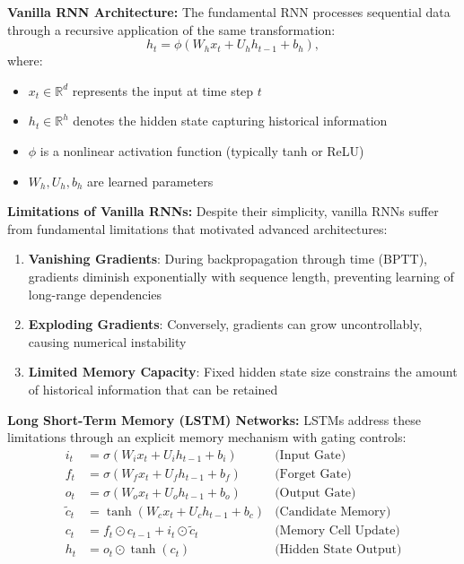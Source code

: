 \documentclass[conference]{IEEEtran}
\begin{document}
\textbf{Vanilla RNN Architecture:}
The fundamental RNN processes sequential data through a recursive application of the same transformation:
\begin{equation}
  h_t = \phi(W_h x_t + U_h h_{t-1} + b_h),
\end{equation}
where:
\begin{itemize}
  \item $x_t \in \mathbb{R}^{d}$ represents the input at time step $t$
  \item $h_t \in \mathbb{R}^{h}$ denotes the hidden state capturing historical information
  \item $\phi$ is a nonlinear activation function (typically tanh or ReLU)
  \item $W_h, U_h, b_h$ are learned parameters
\end{itemize}

\textbf{Limitations of Vanilla RNNs:}
Despite their simplicity, vanilla RNNs suffer from fundamental limitations that motivated advanced architectures:
\begin{enumerate}
  \item \textbf{Vanishing Gradients}: During backpropagation through time (BPTT), gradients diminish exponentially with sequence length, preventing learning of long-range dependencies
  \item \textbf{Exploding Gradients}: Conversely, gradients can grow uncontrollably, causing numerical instability
  \item \textbf{Limited Memory Capacity}: Fixed hidden state size constrains the amount of historical information that can be retained
\end{enumerate}

\textbf{Long Short-Term Memory (LSTM) Networks:}
LSTMs address these limitations through an explicit memory mechanism with gating controls:
\begin{align}
  i_t &= \sigma(W_i x_t + U_i h_{t-1} + b_i) & \text{(Input Gate)} \\
  f_t &= \sigma(W_f x_t + U_f h_{t-1} + b_f) & \text{(Forget Gate)} \\
  o_t &= \sigma(W_o x_t + U_o h_{t-1} + b_o) & \text{(Output Gate)} \\
  \tilde{c}_t &= \tanh(W_c x_t + U_c h_{t-1} + b_c) & \text{(Candidate Memory)} \\
  c_t &= f_t \odot c_{t-1} + i_t \odot \tilde{c}_t & \text{(Memory Cell Update)} \\
  h_t &= o_t \odot \tanh(c_t) & \text{(Hidden State Output)}
\end{align}
\end{document}
